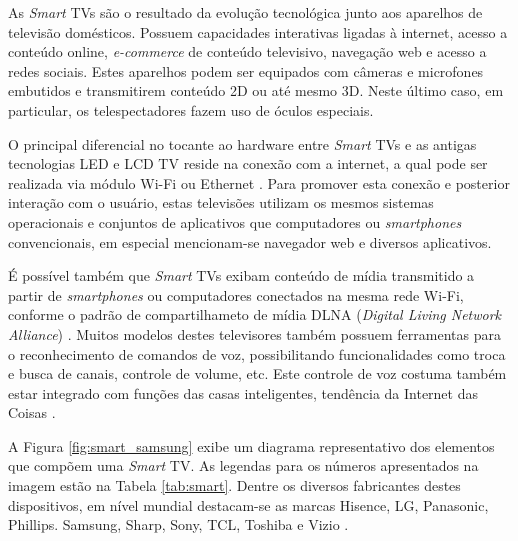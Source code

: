 
As \emph{Smart} TVs são o resultado da evolução tecnológica junto aos aparelhos de televisão domésticos. Possuem capacidades interativas ligadas à internet, acesso a conteúdo online, \emph{e-commerce} de conteúdo televisivo, navegação web e acesso a redes sociais. Estes aparelhos podem ser equipados com câmeras e microfones embutidos e transmitirem conteúdo 2D ou até mesmo 3D. Neste último caso, em particular, os telespectadores fazem uso de óculos especiais.

O principal diferencial no tocante ao hardware entre \emph{Smart} TVs e as antigas tecnologias LED e LCD TV reside na conexão com a internet, a qual pode ser realizada via módulo Wi-Fi ou Ethernet \cite{differencebetween,tomsguid:everythingsmart}. Para promover esta conexão e posterior interação com o usuário, estas televisões utilizam os mesmos sistemas operacionais e conjuntos de aplicativos que computadores ou \emph{smartphones} convencionais, em especial mencionam-se navegador web e diversos aplicativos.

É possível também que \emph{Smart} TVs exibam conteúdo de mídia transmitido a partir de \emph{smartphones} ou computadores conectados na mesma rede Wi-Fi, conforme o padrão de compartilhameto de mídia DLNA (\emph{Digital Living Network Alliance}) \cite{michele2014watch,shin2013smart,perakakis2015proposed,whatisasmarttv}. Muitos modelos destes televisores também possuem ferramentas para o reconhecimento de comandos de voz, possibilitando funcionalidades como troca e busca de canais, controle de volume, etc. Este controle de voz costuma também estar integrado com funções das casas inteligentes, tendência da Internet das Coisas \cite{tomsguid:everythingsmart}.

A Figura \ref{fig:smart_samsung} exibe um diagrama representativo dos elementos que compõem uma \emph{Smart} TV. As legendas para os números apresentados na imagem estão na Tabela \ref{tab:smart}. Dentre os diversos fabricantes destes dispositivos,  em nível mundial destacam-se as marcas Hisence, LG, Panasonic, Phillips. Samsung, Sharp, Sony, TCL, Toshiba e Vizio \cite{tomsguid:everythingsmart}.

